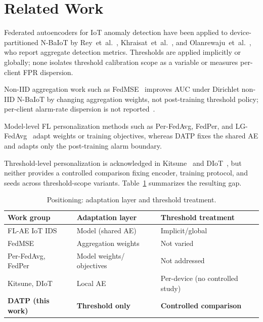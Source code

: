 \section{Related Work}
\label{sec:related}

Federated autoencoders for IoT anomaly detection have been applied to
device-partitioned N-BaIoT by Rey~et~al.~\cite{rey2022federated},
Khraisat~et~al.~\cite{khraisat2025fediot}, and
Olanrewaju~et~al.~\cite{olanrewajugeorge2025flae}, who report aggregate detection
metrics. Thresholds are applied implicitly or globally; none isolates threshold
calibration scope as a variable or measures per-client FPR dispersion.

Non-IID aggregation work such as FedMSE~\cite{nguyen2025fedmse} improves AUC under
Dirichlet non-IID N-BaIoT by changing aggregation weights, not post-training threshold
policy; per-client alarm-rate dispersion is not
reported~\cite{zhao2018noniid,li2022federated}.

Model-level FL personalization methods such as Per-FedAvg, FedPer, and
LG-FedAvg~\cite{fallah2020personalized,arivazhagan2019federated,liang2020think} adapt
weights or training objectives, whereas DATP fixes the shared AE and adapts only the
post-training alarm boundary.

Threshold-level personalization is acknowledged in
Kitsune~\cite{mirsky2018kitsune} and DIoT~\cite{nguyen2019diot}, but neither provides
a controlled comparison fixing encoder, training protocol, and seeds across
threshold-scope variants. Table~\ref{tab:related_comparison} summarizes the resulting gap.

\begin{table}[!b]
  \caption{Positioning: adaptation layer and threshold treatment.}
  \label{tab:related_comparison}
  \centering
  \footnotesize
  \renewcommand{\arraystretch}{1.2}%
  \setlength{\tabcolsep}{4pt}%
  \begin{tabular}{@{}l>{\raggedright\arraybackslash}p{2.3cm}>{\raggedright\arraybackslash}p{2.3cm}@{}}
    \toprule
    Work group & Adaptation layer & Threshold treatment \\
    \midrule
    FL-AE IoT IDS~\cite{rey2022federated,khraisat2025fediot} & Model (shared AE) & Implicit/global \\
    FedMSE~\cite{nguyen2025fedmse} & Aggregation weights & Not varied \\
    Per-FedAvg, FedPer~\cite{fallah2020personalized,arivazhagan2019federated} & Model weights/ objectives & Not addressed \\
    Kitsune, DIoT~\cite{mirsky2018kitsune,nguyen2019diot} & Local AE & Per-device (no controlled study) \\
    \textbf{DATP (this work)} & \textbf{Threshold only} & \textbf{Controlled comparison} \\
    \bottomrule
  \end{tabular}
\end{table}
